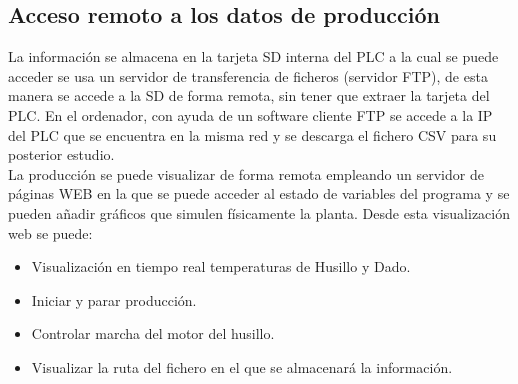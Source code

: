 \subsection{Acceso remoto a los datos de producción}
\label{sec:plc_scada}

La información se almacena en la tarjeta SD interna del PLC a la cual se puede acceder se usa un servidor de transferencia de ficheros (servidor FTP), de esta manera se accede a la SD de forma remota, sin tener que extraer la tarjeta del PLC. En el ordenador, con ayuda de un software cliente FTP se accede a la IP del PLC que se encuentra en la misma red y se descarga el fichero CSV para su posterior estudio.\\

La producción se puede visualizar de forma remota empleando un servidor de páginas WEB en la que se puede acceder al estado de variables del programa y se pueden añadir gráficos que simulen físicamente la planta. Desde esta visualización web se puede:

\begin{itemize}
    \item {Visualización en tiempo real temperaturas de Husillo y Dado.}
    \item {Iniciar y parar producción.}
    \item {Controlar marcha del motor del husillo.}
    \item {Visualizar la ruta del fichero en el que se almacenará la información.}
\end{itemize}

